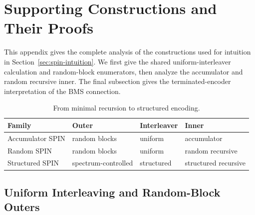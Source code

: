 \section{Supporting Constructions and Their Proofs}
\label{app:supporting-constructions}

This appendix gives the complete analysis of the constructions used for
intuition in Section~\ref{sec:spin-intuition}. We first give the shared
uniform-interleaver calculation and random-block enumerators, then analyze
the accumulator and random recursive inner. The final subsection gives the
terminated-encoder interpretation of the BMS connection.

\begin{table}[!htbp]
  \centering
  \caption{From minimal recursion to structured encoding.}
  \label{tab:spin-families}
\begin{tabular}{@{}llll@{}}
    \toprule
    Family & Outer & Interleaver & Inner \\
    \midrule
    Accumulator SPIN & random blocks & uniform & accumulator \\
    Random SPIN & random blocks & uniform & random recursive \\
    Structured SPIN & spectrum-controlled & structured & structured recursive \\
    \bottomrule
  \end{tabular}
  \end{table}

\subsection{Uniform Interleaving and Random-Block Outers}
\label{app:supporting-framework}







